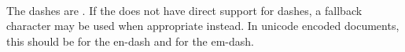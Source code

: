  \\

The dashes are . If the  does not have direct support for dashes, a fallback character may be used when appropriate instead. In unicode encoded documents, this should be  for the en-dash and  for the em-dash. \\

\begin{examples}
\end{examples}

